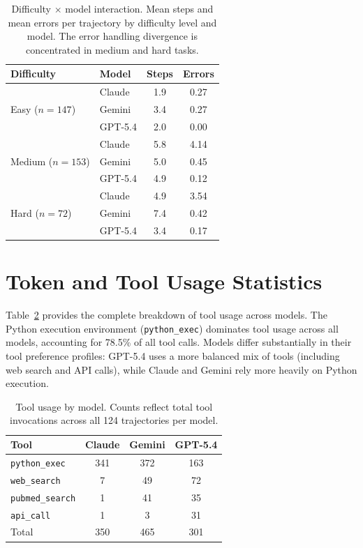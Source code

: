 \documentclass{article}
\begin{document}
\begin{table}[h]
\caption{Difficulty $\times$ model interaction. Mean steps and mean errors per trajectory by difficulty level and model. The error handling divergence is concentrated in medium and hard tasks.}
\label{tab:difficulty}
\centering
\small
\begin{tabular}{llcc}
\toprule
\textbf{Difficulty} & \textbf{Model} & \textbf{Steps} & \textbf{Errors} \\
\midrule
\multirow{3}{*}{Easy ($n=147$)} & Claude & 1.9 & 0.27 \\
& Gemini & 3.4 & 0.27 \\
& GPT-5.4 & 2.0 & 0.00 \\
\midrule
\multirow{3}{*}{Medium ($n=153$)} & Claude & 5.8 & 4.14 \\
& Gemini & 5.0 & 0.45 \\
& GPT-5.4 & 4.9 & 0.12 \\
\midrule
\multirow{3}{*}{Hard ($n=72$)} & Claude & 4.9 & 3.54 \\
& Gemini & 7.4 & 0.42 \\
& GPT-5.4 & 3.4 & 0.17 \\
\bottomrule
\end{tabular}
\end{table}

\section{Token and Tool Usage Statistics}
\label{app:tokens}

Table~\ref{tab:tools} provides the complete breakdown of tool usage across models. The Python execution environment (\texttt{python\_exec}) dominates tool usage across all models, accounting for 78.5\% of all tool calls. Models differ substantially in their tool preference profiles: GPT-5.4 uses a more balanced mix of tools (including web search and API calls), while Claude and Gemini rely more heavily on Python execution.

\begin{table}[h]
\caption{Tool usage by model. Counts reflect total tool invocations across all 124 trajectories per model.}
\label{tab:tools}
\centering
\small
\begin{tabular}{lccc}
\toprule
\textbf{Tool} & \textbf{Claude} & \textbf{Gemini} & \textbf{GPT-5.4} \\
\midrule
\texttt{python\_exec} & 341 & 372 & 163 \\
\texttt{web\_search} & 7 & 49 & 72 \\
\texttt{pubmed\_search} & 1 & 41 & 35 \\
\texttt{api\_call} & 1 & 3 & 31 \\
\midrule
Total & 350 & 465 & 301 \\
\bottomrule
\end{tabular}
\end{table}
\end{document}

